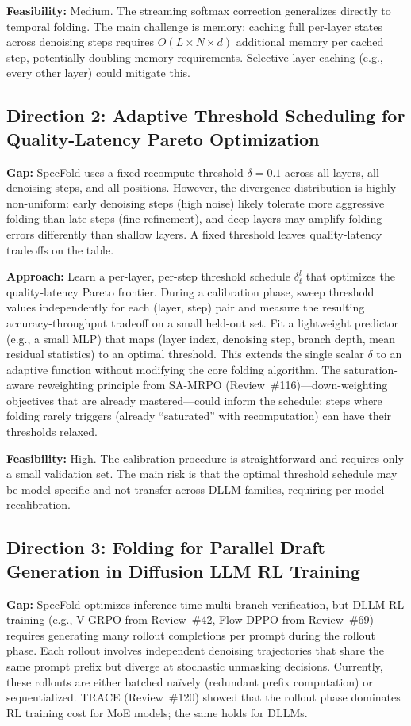 \documentclass[11pt,a4paper]{article}
\begin{document}
\textbf{Feasibility:} Medium. The streaming softmax correction generalizes directly to temporal folding. The main challenge is memory: caching full per-layer states across denoising steps requires $O(L \times N \times d)$ additional memory per cached step, potentially doubling memory requirements. Selective layer caching (e.g., every other layer) could mitigate this.

\subsection{Direction 2: Adaptive Threshold Scheduling for Quality-Latency Pareto Optimization}
\textbf{Gap:} SpecFold uses a fixed recompute threshold $\delta{=}0.1$ across all layers, all denoising steps, and all positions. However, the divergence distribution is highly non-uniform: early denoising steps (high noise) likely tolerate more aggressive folding than late steps (fine refinement), and deep layers may amplify folding errors differently than shallow layers. A fixed threshold leaves quality-latency tradeoffs on the table.

\textbf{Approach:} Learn a per-layer, per-step threshold schedule $\delta^l_t$ that optimizes the quality-latency Pareto frontier. During a calibration phase, sweep threshold values independently for each (layer, step) pair and measure the resulting accuracy-throughput tradeoff on a small held-out set. Fit a lightweight predictor (e.g., a small MLP) that maps (layer index, denoising step, branch depth, mean residual statistics) to an optimal threshold. This extends the single scalar $\delta$ to an adaptive function without modifying the core folding algorithm. The saturation-aware reweighting principle from SA-MRPO (Review~\#116)---down-weighting objectives that are already mastered---could inform the schedule: steps where folding rarely triggers (already ``saturated'' with recomputation) can have their thresholds relaxed.

\textbf{Feasibility:} High. The calibration procedure is straightforward and requires only a small validation set. The main risk is that the optimal threshold schedule may be model-specific and not transfer across DLLM families, requiring per-model recalibration.

\subsection{Direction 3: Folding for Parallel Draft Generation in Diffusion LLM RL Training}
\textbf{Gap:} SpecFold optimizes inference-time multi-branch verification, but DLLM RL training (e.g., V-GRPO from Review~\#42, Flow-DPPO from Review~\#69) requires generating many rollout completions per prompt during the rollout phase. Each rollout involves independent denoising trajectories that share the same prompt prefix but diverge at stochastic unmasking decisions. Currently, these rollouts are either batched na\"ively (redundant prefix computation) or sequentialized. TRACE (Review~\#120) showed that the rollout phase dominates RL training cost for MoE models; the same holds for DLLMs.
\end{document}
